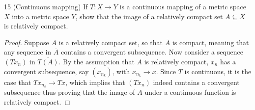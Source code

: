 \begin{exercise}{15 (Continuous mapping)}
If $T: X \to Y$ is a continuous mapping of a metric space $X$ into a metric space $Y$, show that the image of a relatively compact set $A \subseteq X$ is relatively compact.
\end{exercise}
\begin{proof}
Suppose $A$ is a relatively compact set, so that $\overline{A}$ is compact, meaning that any sequence in $\overline{A}$ contains a convergent subsequence.
Now consider a sequence $(T x_n)$ in $\overline{T(A)}$.
By the assumption that $A$ is relatively compact, $x_n$ has a convergent subsequence, say $(x_{n_k})$, with $x_{n_k} \to x$.
Since $T$ is continuous, it is the case that $T x_{n_k} \to T x$, which implies that $(T x_n)$ indeed contains a convergent subsequence thus proving that the image of $A$ under a continuous function is relatively compact.
\end{proof} 
